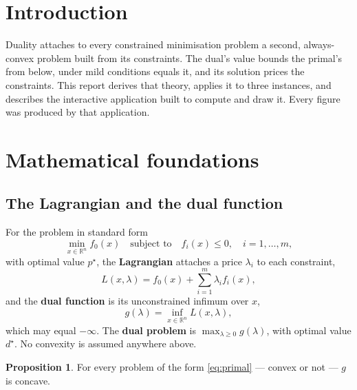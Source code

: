 \documentclass[11pt,a4paper]{article}
\theoremstyle{definition}
\newtheorem{proposition}{Proposition}
\newcommand{\R}{\mathbb{R}}
\newcommand{\pstar}{p^{\star}}
\newcommand{\dstar}{d^{\star}}
\begin{document}
\vspace{0.6cm}
\tableofcontents
\newpage

\section{Introduction}

Duality attaches to every constrained minimisation problem a second, always-convex problem built
from its constraints. The dual's value bounds the primal's from below, under mild conditions
equals it, and its solution prices the constraints. This report derives that theory, applies it
to three instances, and describes the interactive application built to compute and draw it.
Every figure was produced by that application.

\section{Mathematical foundations}\label{sec:theory}

\subsection{The Lagrangian and the dual function}

For the problem in standard form
\begin{equation}\label{eq:primal}
\min_{x\in\R^{n}} f_{0}(x)\quad\text{subject to}\quad f_{i}(x)\le 0,\quad i=1,\dots,m,
\end{equation}
with optimal value $\pstar$, the \textbf{Lagrangian} attaches a price $\lambda_{i}$ to each
constraint,
\begin{equation}
L(x,\lambda)=f_{0}(x)+\sum_{i=1}^{m}\lambda_{i}f_{i}(x),
\end{equation}
and the \textbf{dual function} is its unconstrained infimum over $x$,
\begin{equation}\label{eq:dual}
g(\lambda)=\inf_{x\in\R^{n}}L(x,\lambda),
\end{equation}
which may equal $-\infty$. The \textbf{dual problem} is $\max_{\lambda\ge 0}g(\lambda)$, with
optimal value $\dstar$. No convexity is assumed anywhere above.

\begin{proposition}\label{prop:concave}
For every problem of the form \eqref{eq:primal} --- convex or not --- $g$ is concave.
\end{proposition}
\end{document}
